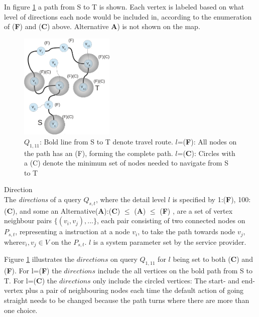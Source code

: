 In figure \ref{fig:minroute} a path from S to T is shown. Each vertex is labeled based on what level of directions each node would be included in, according to the enumeration of (\textbf{F}) and (\textbf{C}) above. Alternative \textbf{A}) is not shown on the map.


\begin{figure}[hbt]
  \center
        \includegraphics[width=0.4\textwidth]{figures/minroute}
        \caption{$Q_{1,11}$: Bold line from S to T denote travel route. $l$=(\textbf{F}): All nodes on the path has an (F), forming the complete path. 
        $l$=(\textbf{C}): Circles with a (C) denote the minimum set of nodes needed to navigate from S to T}
  \label{fig:minroute}
\end{figure}


\begin{definition}\label{def:direction} {Direction}\\
The \textit{directions} of a query $Q_{s,t}$, where the detail level $l$ is specified by 1:(\textbf{F}), 100:(\textbf{C}), and some an Alternative(\textbf{A}):(\textbf{C}) $\leq$ (\textbf{A}) $\leq$ (\textbf{F}) , are a set of vertex neighbour pairs $\{(v_i,v_j),...\}$, each pair consisting of two connected nodes on $P_{s,t}$, representing a instruction at a node $v_i$, to take the path towards node $v_j$, where$v_i,v_j \in V$ on the \spath $P_{s,t}$.
$l$ is a system parameter set by the service provider.
\end{definition}

Figure \ref{fig:minroute} illustrates the $directions$ on query $Q_{1,11}$ for $l$ being set to both (\textbf{C}) and (\textbf{F}). For l=(\textbf{F}) the $directions$ include the all vertices on the bold path from S to T. For l=(\textbf{C}) the $directions$ only include the circled vertices: The start- and end-vertex plus a pair of neighbouring nodes each time the default action of going straight needs to be changed because the path turns where there are more than one choice.


